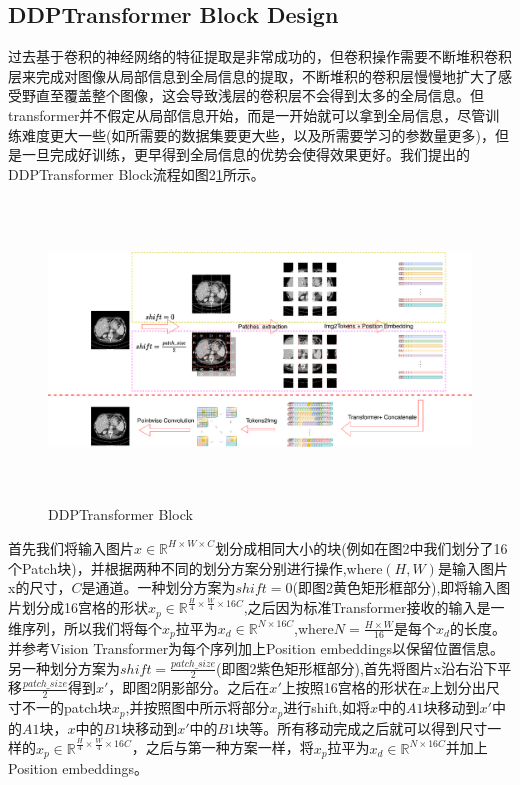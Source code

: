 \subsection{DDPTransformer Block Design}

过去基于卷积的神经网络的特征提取是非常成功的，但卷积操作需要不断堆积卷积层来完成对图像从局部信息到全局信息的提取，不断堆积的卷积层慢慢地扩大了感受野直至覆盖整个图像，这会导致浅层的卷积层不会得到太多的全局信息。但transformer并不假定从局部信息开始，而是一开始就可以拿到全局信息，尽管训练难度更大一些(如所需要的数据集要更大些，以及所需要学习的参数量更多)，但是一旦完成好训练，更早得到全局信息的优势会使得效果更好。我们提出的DDPTransformer Block流程如图2\ref{fig2}所示。\par
\begin{figure}
	\centering
	\includegraphics[height=8cm,width=18cm]{5.eps}
	\caption{DDPTransformer Block}
	\label{fig2}
\end{figure}
首先我们将输入图片$x \in \mathbb{R}^{H\times W \times C}$划分成相同大小的块(例如在图2中我们划分了16个Patch块)，并根据两种不同的划分方案分别进行操作,where$(H,W)$是输入图片x的尺寸，$C$是通道。一种划分方案为$shift=0$(即图2黄色矩形框部分),即将输入图片划分成16宫格的形状$x_p \in \mathbb{R}^{\frac{H}{4}\times \frac{W}{4} \times 16C}$,之后因为标准Transformer接收的输入是一维序列，所以我们将每个$x_p$拉平为$x_d \in \mathbb{R}^{N \times 16C}$,where$N = \frac{H\times W}{16}$是每个$x_d$的长度。并参考Vision Transformer为每个序列加上Position embeddings以保留位置信息。另一种划分方案为$shift=\frac{patch\_size}{2}$(即图2紫色矩形框部分),首先将图片x沿右沿下平移$\frac{patch\_size}{2}$得到$x'$，即图2阴影部分。之后在$x'$上按照16宫格的形状在$x$上划分出尺寸不一的patch块$x_p$,并按照图中所示将部分$x_p$进行shift,如将$x$中的$A1$块移动到$x'$中的$A1$块，$x$中的$B1$块移动到$x'$中的$B1$块等。所有移动完成之后就可以得到尺寸一样的$x_p \in \mathbb{R}^{\frac{H}{4}\times \frac{W}{4} \times 16C}$，之后与第一种方案一样，将$x_p$拉平为$x_d \in \mathbb{R}^{N \times 16C}$并加上Position embeddings。\par

